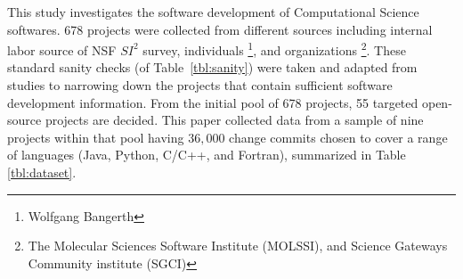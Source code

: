 \documentclass[10pt,conference]{IEEEtran}
\newcommand{\bi}{\begin{itemize}[leftmargin=0.4cm]}
\newcommand{\ei}{\end{itemize}}
\begin{document}
This study investigates the software development of Computational Science softwares.  678 projects were collected from different sources including internal labor source of NSF $SI^2$ survey, individuals \footnote{Wolfgang Bangerth}, and organizations \footnote{The Molecular Sciences Software Institute (MOLSSI), and Science Gateways Community institute (SGCI)}. These standard sanity checks (of Table~\ref{tbl:sanity}) were taken and adapted from studies \cite{bird09promise,agrawal2018we, eirini15promise, munaiah17curating} to narrowing down the projects that contain sufficient software development information. From the initial pool of 678 projects, 55 targeted open-source projects are decided. This paper collected data from a sample of nine projects within that pool having $36,000$ change commits chosen to cover a range of languages (Java, Python, C/C++, and Fortran), summarized in Table \ref{tbl:dataset}.



\end{document}
